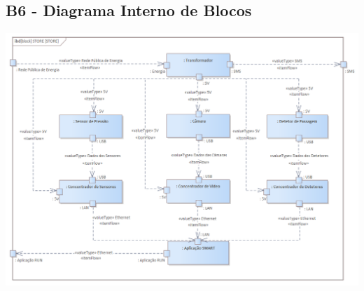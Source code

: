 \documentclass{article}
\begin{document}
\begin{landscape}
	\section*{B6 - Diagrama Interno de Blocos}
	\vspace*{\fill}
	\begin{center}
		\includegraphics[width=1.3\textheight,height=\textwidth,keepaspectratio]{B6}
	\end{center}
	\vspace*{\fill}
\end{landscape}
\end{document}
